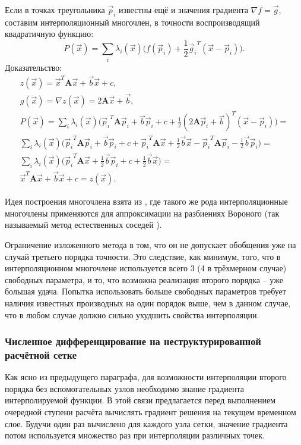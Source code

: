 Если в точках треугольника $\vec{p}_i$ известны ещё и значения градиента $\nabla f = \vec{g}$, составим интерполяционный многочлен, в точности воспроизводящий квадратичную функцию:
\begin{equation}
P(\vec{x}) = \sum_{i} \lambda_i(\vec{x}) \Big(f(\vec{p}_i) + \frac{1}{2} {\vec{g}_i}^T (\vec{x} - \vec{p}_i) \Big).
\end{equation}
Доказательство:
\begin{align}
z(\vec{x}) = \vec{x}^T \mathbf{A} \vec{x} + \vec{b} \vec{x} + c, \\
g(\vec{x}) = \nabla z(\vec{x}) = 2 \mathbf{A} \vec{x} + \vec{b}, \\
P(\vec{x}) = \sum_{i} \lambda_i({\vec{x}}) \Big( {\vec{p}_i}^T \mathbf{A} \vec{p}_i + \vec{b} \vec{p}_i + c + \frac{1}{2} (2\mathbf{A}\vec{p}_i + \vec{b})^T (\vec{x} - \vec{p}_i) \Big) = \\
\sum_{i} \lambda_i({\vec{x}}) \Big( {\vec{p}_i}^T \mathbf{A} \vec{p}_i + \vec{b} \vec{p}_i + c + {\vec{p}_i}^T \mathbf{A} \vec{x} + \frac{1}{2} \vec{b}\vec{x} - {\vec{p}_i}^T \mathbf{A} \vec{p}_i - \frac{1}{2} \vec{b} \vec{p}_i  \Big) = \\
\sum_{i} \lambda_i({\vec{x}}) \Big( {\vec{p}_i}^T \mathbf{A} \vec{x} + \frac{1}{2} \vec{b} \vec{p}_i + c + \frac{1}{2} \vec{b}\vec{x}  \Big) = \\
\vec{x}^T \mathbf{A} \vec{x} + \vec{b} \vec{x} + c = z(\vec{x}).
\end{align}

Идея построения многочлена взята из \cite{cgal_interpolation}, где такого же рода интерполяционные многочлены применяются для аппроксимации на разбиениях Вороного (так называемый метод естественных соседей \cite{sibson, natural_neighbors}).

Ограничение изложенного метода в том, что он не допускает обобщения уже на случай третьего порядка точности. Это следствие, как минимум, того, что в интерполяционном многочлене используется всего 3 (4 в трёхмерном случае) свободных параметра, и то, что возможна реализация второго порядка -- уже большая удача. Попытка использовать больше свободных параметров требует наличия известных производных на один порядок выше, чем в данном случае, что в любом случае должно сильно ухудшить свойства интерполяции.


\subsubsection{Численное дифференцирование на неструктурированной расчётной сетке}
Как ясно из предыдущего параграфа, для возможности интерполяции второго порядка без вспомогательных узлов необходимо знание градиента интерполируемой функции. В этой связи предлагается перед выполнением очередной ступени расчёта вычислять градиент решения на текущем временном слое. Будучи один раз вычислено для каждого узла сетки, значение градиента потом используется множество раз при интерполяции различных точек.

